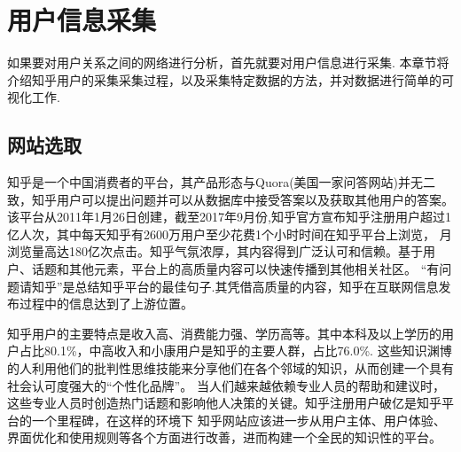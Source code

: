 \documentclass[bachelor,adobefonts]{jnuthesis}
\begin{document}










\chapter{用户信息采集}
如果要对用户关系之间的网络进行分析，首先就要对用户信息进行采集.
本章节将介绍知乎用户的采集采集过程，以及采集特定数据的方法，并对数据进行简单的可视化工作.

\section{网站选取}
知乎是一个中国消费者的平台，其产品形态与Quora(美国一家问答网站)并无二致，知乎用户可以提出问题并可以从数据库中接受答案以及获取其他用户的答案。
该平台从2011年1月26日创建，截至2017年9月份,知乎官方宣布知乎注册用户超过1亿人次，其中每天知乎有2600万用户至少花费1个小时时间在知乎平台上浏览，
月浏览量高达180亿次点击。知乎气氛浓厚，其内容得到广泛认可和信赖。基于用户、话题和其他元素，平台上的高质量内容可以快速传播到其他相关社区。
“有问题请知乎”是总结知乎平台的最佳句子.其凭借高质量的内容，知乎在互联网信息发布过程中的信息达到了上游位置。

知乎用户的主要特点是收入高、消费能力强、学历高等。其中本科及以上学历的用户占比80.1\%，中高收入和小康用户是知乎的主要人群，占比76.0\%.
这些知识渊博的人利用他们的批判性思维技能来分享他们在各个邻域的知识，从而创建一个具有社会认可度强大的“个性化品牌”。
当人们越来越依赖专业人员的帮助和建议时，这些专业人员时创造热门话题和影响他人决策的关键。知乎注册用户破亿是知乎平台的一个里程碑，在这样的环境下
知乎网站应该进一步从用户主体、用户体验、界面优化和使用规则等各个方面进行改善，进而构建一个全民的知识性的平台。
\end{document}
